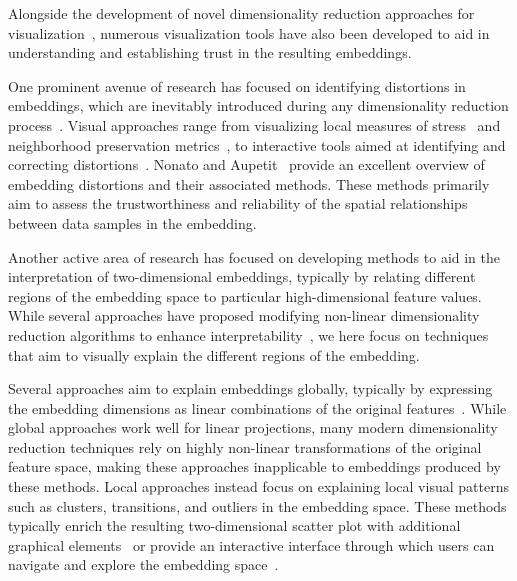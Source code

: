 \documentclass[lettersize,journal]{IEEEtran}
\begin{document}
Alongside the development of novel dimensionality reduction approaches for visualization~\cite{Kruskal1978,Maaten2008,McInnes2018}, numerous visualization tools have also been developed to aid in understanding and establishing trust in the resulting embeddings.

One prominent avenue of research has focused on identifying distortions in embeddings, which are inevitably introduced during any dimensionality reduction process~\cite{NonatoAupetit2019}. Visual approaches range from visualizing local measures of stress~\cite{Schreck2010,Seifert2010} and neighborhood preservation metrics~\cite{Aupetit2007,LespinatsAupetit2011,Martins2014}, to interactive tools aimed at identifying and correcting distortions~\cite{Heulot2013,Stahnke2016}.
Nonato and Aupetit~\cite{NonatoAupetit2019} provide an excellent overview of embedding distortions and their associated methods.
These methods primarily aim to assess the trustworthiness and reliability of the spatial relationships between data samples in the embedding.

Another active area of research has focused on developing methods to aid in the interpretation of two-dimensional embeddings, typically by relating different regions of the embedding space to particular high-dimensional feature values.
While several approaches have proposed modifying non-linear dimensionality reduction algorithms to enhance interpretability~\cite{Couplet2023,Scicluna2023}, we here focus on techniques that aim to visually explain the different regions of the embedding.

Several approaches aim to explain embeddings globally, typically by expressing the embedding dimensions as linear combinations of the original features~\cite{Broeksema2013,Coimbra2016}.
While global approaches work well for linear projections, many modern dimensionality reduction techniques rely on highly non-linear transformations of the original feature space, making these approaches inapplicable to embeddings produced by these methods.
Local approaches instead focus on explaining local visual patterns such as clusters, transitions, and outliers in the embedding space.
These methods typically enrich the resulting two-dimensional scatter plot with additional graphical elements~\cite{Joia2015,ChengMueller2016,Tian2021} or provide an interactive interface through which users can navigate and explore the embedding space~\cite{Kandogan2012,Stahnke2016,Bibal2021}.
\end{document}
